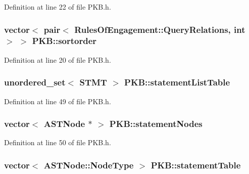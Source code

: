 Definition at line 22 of file P\-K\-B.\-h.

\hypertarget{class_p_k_b_aa0386fc54ac3aa101697cec565cd97ab}{
\subsubsection[{sortorder}]{\setlength{\rightskip}{0pt plus 5cm}vector$<$ pair$<$ {\bf Rules\-Of\-Engagement\-::\-Query\-Relations}, int $>$ $>$ P\-K\-B\-::sortorder\hspace{0.3cm}{\ttfamily [static]}}}\label{class_p_k_b_aa0386fc54ac3aa101697cec565cd97ab}


Definition at line 20 of file P\-K\-B.\-h.

\hypertarget{class_p_k_b_adc4120ed1f3472e49ba743fdb5a7f57e}{
\subsubsection[{statement\-List\-Table}]{\setlength{\rightskip}{0pt plus 5cm}unordered\-\_\-set$<$ {\bf S\-T\-M\-T} $>$ P\-K\-B\-::statement\-List\-Table\hspace{0.3cm}{\ttfamily [static]}}}\label{class_p_k_b_adc4120ed1f3472e49ba743fdb5a7f57e}


Definition at line 49 of file P\-K\-B.\-h.

\hypertarget{class_p_k_b_a04aa565187bc3a566ac0163027e46f46}{
\subsubsection[{statement\-Nodes}]{\setlength{\rightskip}{0pt plus 5cm}vector$<$ {\bf A\-S\-T\-Node} $\ast$ $>$ P\-K\-B\-::statement\-Nodes\hspace{0.3cm}{\ttfamily [static]}}}\label{class_p_k_b_a04aa565187bc3a566ac0163027e46f46}


Definition at line 50 of file P\-K\-B.\-h.

\hypertarget{class_p_k_b_a295e1559f863827d703055a49a1b888b}{
\subsubsection[{statement\-Table}]{\setlength{\rightskip}{0pt plus 5cm}vector$<$ {\bf A\-S\-T\-Node\-::\-Node\-Type} $>$ P\-K\-B\-::statement\-Table\hspace{0.3cm}{\ttfamily [static]}}}\label{class_p_k_b_a295e1559f863827d703055a49a1b888b}


